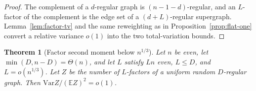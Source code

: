 \documentclass[11pt]{article}
\newtheorem{theorem}{Theorem}
\newcommand{\EE}{\mathbb{E}}
\newcommand{\Var}{\mathrm{Var}}
\begin{document}
\begin{proof}
The complement of a \(d\)-regular graph is \((n-1-d)\)-regular, and an \(L\)-factor of the complement is the edge set of a \((d+L)\)-regular supergraph.
Lemma~\ref{lem:factor-tv} and the same reweighting as in Proposition~\ref{prop:flat-one} convert a relative variance \(o(1)\) into the two total-variation bounds.
\end{proof}

\begin{theorem}[Factor second moment below \(n^{1/3}\)]
\label{thm:factor-third}
Let \(n\) be even, let \(\min(D,n-D)=\Theta(n)\), and let \(L\) satisfy \(Ln\) even, \(L\le D\), and \(L=o(n^{1/3})\).
Let \(Z\) be the number of \(L\)-factors of a uniform random \(D\)-regular graph.
Then \(\Var Z/(\EE Z)^2=o(1)\).
\end{theorem}
\end{document}
